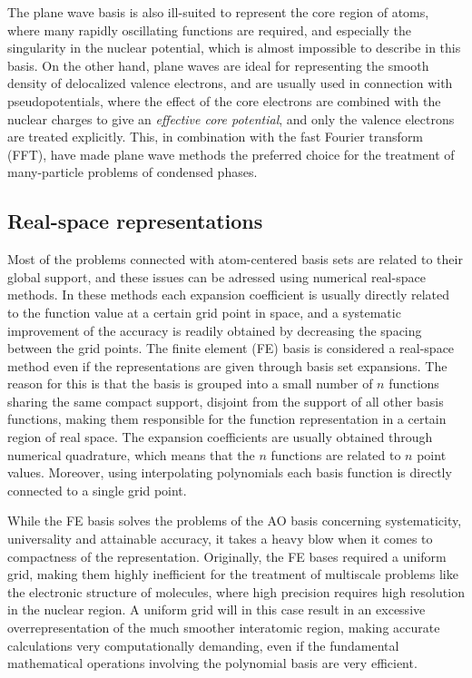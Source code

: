 The plane wave basis is also ill-suited to represent the core region of atoms, where many rapidly oscillating 
functions are required, and especially the singularity in the nuclear potential, which is almost impossible
to describe in this basis. On the other hand, plane waves are ideal for representing the smooth density of
delocalized valence electrons, and are usually used in connection with pseudopotentials, where the 
effect of the core electrons are combined with the nuclear charges to give an \emph{effective core
potential}, and only the valence electrons are treated explicitly. This, in combination with the
fast Fourier transform (FFT), have made plane wave methods the preferred choice for the treatment of 
many-particle problems of condensed phases. 

\subsection{Real-space representations}
Most of the problems connected with atom-centered basis sets are related to their global support,
and these issues can be adressed using numerical real-space methods. In these methods each expansion
coefficient is usually directly related to the function value at a certain grid point in space, and
a systematic improvement of the accuracy is readily obtained by decreasing the spacing between the 
grid points. The finite element (FE) basis is considered a real-space method even if the representations
are given through basis set expansions. The reason for this is that the basis is grouped into a small
number of $n$ functions sharing the same compact support, disjoint from the support of all other basis 
functions, making them responsible for the function representation in a certain region of real space.
The expansion coefficients are usually obtained through numerical quadrature, which means that the $n$
functions are related to $n$ point values. Moreover, using interpolating polynomials each basis function 
is directly connected to a single grid point.

While the FE basis solves the problems of the AO basis concerning systematicity, universality and 
attainable accuracy, it takes a heavy blow when it comes to compactness of the representation. 
Originally, the FE bases required a uniform grid, making them highly inefficient for the treatment of
multiscale problems like the electronic structure of molecules, where high precision requires 
high resolution in the nuclear region. A uniform grid will in this case result in an excessive 
overrepresentation of the much smoother interatomic region, making accurate calculations very 
computationally demanding, even if the fundamental mathematical operations involving the polynomial
basis are very efficient. 

